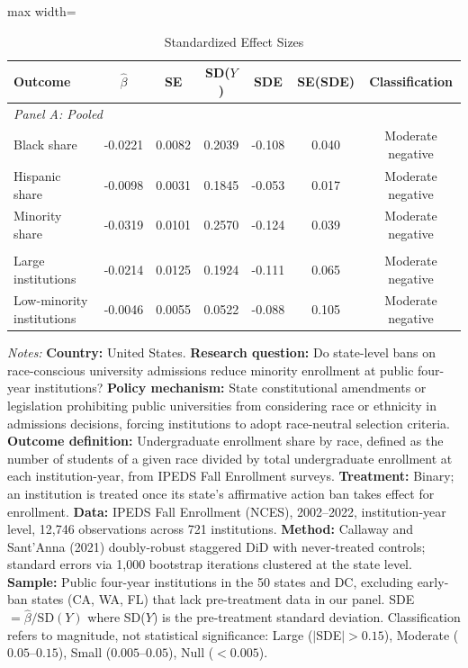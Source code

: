 \begin{table}[htbp]
\centering
\caption{Standardized Effect Sizes}
\label{tab:sde}
\begin{adjustbox}{max width=\textwidth}
\begin{tabular}{lcccccc}
\hline\hline
Outcome & $\hat{\beta}$ & SE & SD($Y$) & SDE & SE(SDE) & Classification \\
\hline
\multicolumn{7}{l}{\textit{Panel A: Pooled}} \\
\addlinespace
Black share & -0.0221 & 0.0082 & 0.2039 & -0.108 & 0.040 & Moderate negative \\
Hispanic share & -0.0098 & 0.0031 & 0.1845 & -0.053 & 0.017 & Moderate negative \\
Minority share & -0.0319 & 0.0101 & 0.2570 & -0.124 & 0.039 & Moderate negative \\
\addlinespace
\multicolumn{7}{l}{\textit{Panel B: Heterogeneous (by institution size)}} \\
\addlinespace
Large institutions & -0.0214 & 0.0125 & 0.1924 & -0.111 & 0.065 & Moderate negative \\
Low-minority institutions & -0.0046 & 0.0055 & 0.0522 & -0.088 & 0.105 & Moderate negative \\
\hline\hline
\end{tabular}
\end{adjustbox}
\begin{tablenotes}
\item \textit{Notes:} \textbf{Country:} United States. \textbf{Research question:} Do state-level bans on race-conscious university admissions reduce minority enrollment at public four-year institutions? \textbf{Policy mechanism:} State constitutional amendments or legislation prohibiting public universities from considering race or ethnicity in admissions decisions, forcing institutions to adopt race-neutral selection criteria. \textbf{Outcome definition:} Undergraduate enrollment share by race, defined as the number of students of a given race divided by total undergraduate enrollment at each institution-year, from IPEDS Fall Enrollment surveys. \textbf{Treatment:} Binary; an institution is treated once its state's affirmative action ban takes effect for enrollment. \textbf{Data:} IPEDS Fall Enrollment (NCES), 2002--2022, institution-year level, 12,746 observations across 721 institutions. \textbf{Method:} Callaway and Sant'Anna (2021) doubly-robust staggered DiD with never-treated controls; standard errors via 1,000 bootstrap iterations clustered at the state level. \textbf{Sample:} Public four-year institutions in the 50 states and DC, excluding early-ban states (CA, WA, FL) that lack pre-treatment data in our panel. SDE $= \hat{\beta} / \text{SD}(Y)$ where SD($Y$) is the pre-treatment standard deviation. Classification refers to magnitude, not statistical significance: Large ($|$SDE$| > 0.15$), Moderate ($0.05$--$0.15$), Small ($0.005$--$0.05$), Null ($< 0.005$). 
\end{tablenotes}
\end{table}
